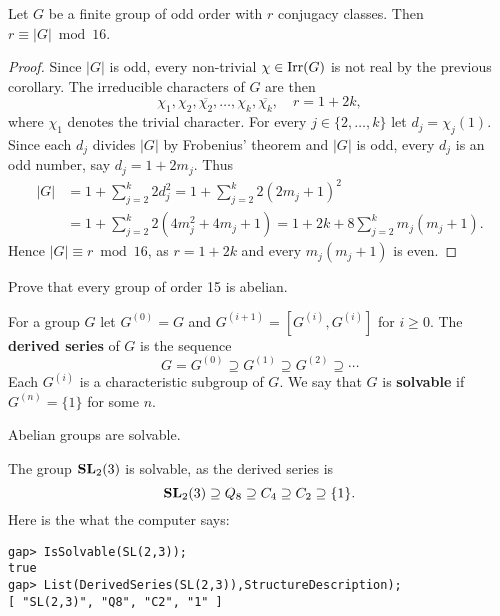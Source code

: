 \begin{theorem}[Burnside]
  \label{thm:Burnside_mod16}
  Let $G$ be a finite group of odd order 
  with $r$ conjugacy classes. Then
  $r\equiv|G|\bmod{16}$.
\end{theorem}

\begin{proof}
  Since $|G|$ is odd, every non-trivial $\chi\in\operatorname{Irr}(G)$ is not real by
  the previous corollary. The irreducible characters 
  of $G$ are then 
  \[
    \chi_1,\chi_2,\overline{\chi_2},\dots,\chi_k,\overline{\chi_k},
    \quad
    r=1+2k,
  \]
  where $\chi_1$ denotes the trivial character. 
  For every $j\in\{2,\dots,k\}$ let $d_j=\chi_j(1)$. 
  Since each $d_j$ divides 
  $|G|$ by Frobenius' theorem and  $|G|$ is odd, 
  every $d_j$ is an odd number, 
  say $d_j=1+2m_j$. Thus  
  \begin{align*}
    |G|&=1+\sum_{j=2}^k 2d_j^2=1+\sum_{j=2}^k2(2m_j+1)^2\\
    &=1+\sum_{j=2}^k2(4m_j^2+4m_j+1)
    =1+2k+8\sum_{j=2}^km_j(m_j+1).
  \end{align*}
  Hence $|G|\equiv r\bmod{16}$, 
  as $r=1+2k$ and every $m_j(m_j+1)$ is even. 
\end{proof}

\begin{exercise}
    Prove that every group of order 15 is abelian. 
\end{exercise}


For a group $G$ let 
$G^{(0)}=G$ and 
$G^{(i+1)}=[G^{(i)},G^{(i)}]$ for $i\geq0$.
The \textbf{derived series} of $G$ is the sequence
\[
G=G^{(0)}\supseteq G^{(1)}\supseteq G^{(2)}\supseteq\cdots
\]
Each $G^{(i)}$ is a characteristic subgroup of $G$. We say that 
$G$ is \textbf{solvable} if $G^{(n)}=\{1\}$ for some $n$.  

\begin{example}
	Abelian groups are solvable. 
\end{example}

\begin{example}
	The group $\mathbf{SL}_2(3)$ is solvable, as the derived series is 
	\[
	\mathbf{SL}_2(3)\supseteq Q_8\supseteq C_4\supseteq C_2\supseteq \{1\}.
	\]
	Here is the what the computer says:
\begin{lstlisting}
gap> IsSolvable(SL(2,3));
true
gap> List(DerivedSeries(SL(2,3)),StructureDescription);
[ "SL(2,3)", "Q8", "C2", "1" ]
\end{lstlisting}
\end{example}

